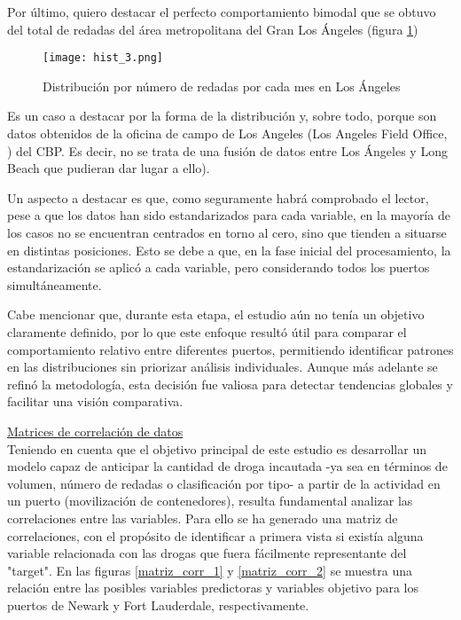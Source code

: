 \documentclass[12pt]{article}
\begin{document}
		Por último, quiero destacar el perfecto comportamiento bimodal que se obtuvo del total de redadas del área metropolitana del Gran Los Ángeles (figura  \ref{hist_3})
		
		\begin{figure}[H]
			\caption{\label{hist_3} Distribución por número de redadas por cada mes en Los Ángeles}
			\centering
			\hspace*{1cm}
			\texttt{[image: hist\_3.png]}
		\end{figure}
	
		Es un caso a destacar por la forma de la distribución y, sobre todo, porque son datos obtenidos de la oficina de campo de Los Angeles (Los Angeles Field Office, \cite{cbp_la_field_office}) del CBP. Es decir, no se trata de una fusión de datos entre Los Ángeles y Long Beach que pudieran dar lugar a ello).
		
		Un aspecto a destacar es que, como seguramente habrá comprobado el lector, pese a que los datos han sido estandarizados para cada variable, en la mayoría de los casos no se encuentran centrados en torno al cero, sino que tienden a situarse en distintas posiciones. Esto se debe a que, en la fase inicial del procesamiento, la estandarización se aplicó a cada variable, pero considerando todos los puertos simultáneamente.
		
		Cabe mencionar que, durante esta etapa, el estudio aún no tenía un objetivo claramente definido, por lo que este enfoque resultó útil para comparar el comportamiento relativo entre diferentes puertos, permitiendo identificar patrones en las distribuciones sin priorizar análisis individuales. Aunque más adelante se refinó la metodología, esta decisión fue valiosa para detectar tendencias globales y facilitar una visión comparativa.
		
		\underline{Matrices de correlación de datos}\\
		Teniendo en cuenta que el objetivo principal de este estudio es desarrollar un modelo capaz de anticipar la cantidad de droga incautada -ya sea en términos de volumen, número de redadas o clasificación por tipo- a partir de la actividad en un puerto (movilización de contenedores), resulta fundamental analizar las correlaciones entre las variables. Para ello se ha generado una matriz de correlaciones, con el propósito de identificar a primera vista si existía alguna variable relacionada con las drogas que fuera fácilmente representante del "target". En las figuras \ref{matriz_corr_1} y \ref{matriz_corr_2} se muestra una relación entre las posibles variables predictoras y variables objetivo para los puertos de Newark y Fort Lauderdale, respectivamente.
		
\end{document}

